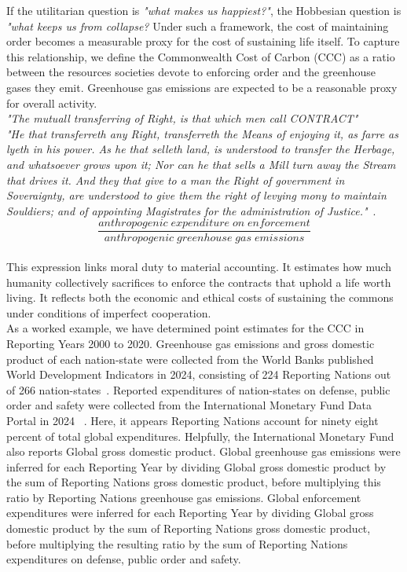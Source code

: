 \documentclass[10pt, oneside]{article}   	%
\begin{document}
If the utilitarian question is \emph{"what makes us happiest?"}, the Hobbesian question is \emph{"what keeps us from collapse?}
Under such a framework, the cost of maintaining order becomes a measurable proxy for the cost of sustaining life itself.
To capture this relationship, we define the Commonwealth Cost of Carbon (CCC) as a ratio between the resources societies devote to enforcing order and the greenhouse gases they emit.
Greenhouse gas emissions are expected to be a reasonable proxy for overall activity.\\

\emph{"The mutuall transferring of Right, is that which men call CONTRACT"}\\

\emph{"He that transferreth any Right, transferreth the Means of enjoying it, as farre as lyeth in his power.
As he that selleth land, is understood to transfer the Herbage, and whatsoever grows upon it; Nor can he that sells a Mill turn away the Stream that drives it.
And they that give to a man the Right of government in Soveraignty, are understood to give them the right of levying mony to maintain Souldiers; and of appointing Magistrates for the administration of Justice."}~\cite{th1}.\\

\begin{equation}
	\frac{anthropogenic\; expenditure\; on\; enforcement}{anthropogenic\; greenhouse\; gas\; emissions}
\end{equation}\\

This expression links moral duty to material accounting.
It estimates how much humanity collectively sacrifices to enforce the contracts that uphold a life worth living.
It reflects both the economic and ethical costs of sustaining the commons under conditions of imperfect cooperation.\\

As a worked example, we have determined point estimates for the CCC in Reporting Years 2000 to 2020.
Greenhouse gas emissions and gross domestic product of each nation-state were collected from the World Banks published World Development Indicators in 2024, consisting of 224 Reporting Nations out of 266 nation-states~\cite{wbank}.
Reported expenditures of nation-states on defense, public order and safety were collected from the International Monetary Fund Data Portal in 2024 ~\cite{imf}.
Here, it appears Reporting Nations account for ninety eight percent of total global expenditures.
Helpfully, the International Monetary Fund also reports Global gross domestic product.
Global greenhouse gas emissions were inferred for each Reporting Year by dividing Global gross domestic product by the sum of Reporting Nations gross domestic product, before multiplying this ratio by Reporting Nations greenhouse gas emissions.
Global enforcement expenditures were inferred for each Reporting Year by dividing Global gross domestic product by the sum of Reporting Nations gross domestic product, before multiplying the resulting ratio by the sum of Reporting Nations expenditures on defense, public order and safety.\\
\end{document}
